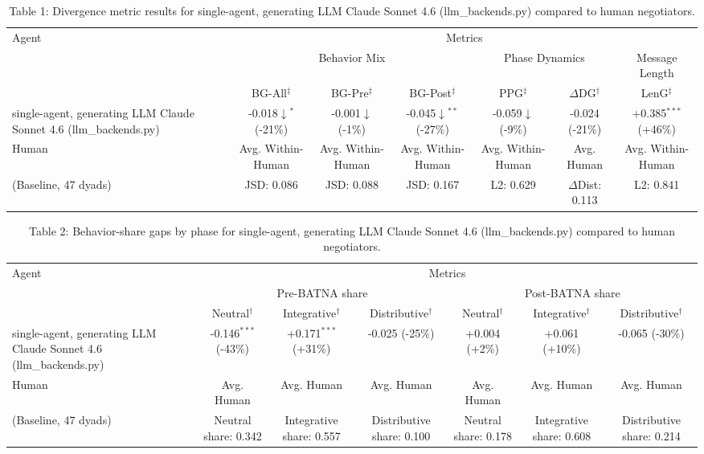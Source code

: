 \begin{table}[t]
\centering
\begin{tabular}{lcccccc}
\toprule
\multirow{3}{*}{Agent} & \multicolumn{6}{c}{Metrics} \\
\cmidrule(lr){2-7}
 & \multicolumn{3}{c}{Behavior Mix} & \multicolumn{2}{c}{Phase Dynamics} & \multicolumn{1}{c}{Message Length} \\
\cmidrule(lr){2-4} \cmidrule(lr){5-6} \cmidrule(lr){7-7}
 & BG-All$^\ddagger$ & BG-Pre$^\ddagger$ & BG-Post$^\ddagger$ & PPG$^\ddagger$ & $\Delta$DG$^\dagger$ & LenG$^\ddagger$ \\
\midrule
single-agent, generating LLM Claude Sonnet 4.6 (llm_backends.py) & -0.018$\downarrow$$^{*}$ (-21\%) & -0.001$\downarrow$ (-1\%) & -0.045$\downarrow$$^{**}$ (-27\%) & -0.059$\downarrow$ (-9\%) & -0.024 (-21\%) & +0.385$^{***}$ (+46\%) \\
\midrule
Human & Avg. Within-Human & Avg. Within-Human & Avg. Within-Human & Avg. Within-Human & Avg. Human & Avg. Within-Human \\
(Baseline, 47 dyads) & JSD: 0.086 & JSD: 0.088 & JSD: 0.167 & L2: 0.629 & $\Delta$Dist: 0.113 & L2: 0.841 \\
\bottomrule
\end{tabular}
\caption{Table 1: Divergence metric results for single-agent, generating LLM Claude Sonnet 4.6 (llm_backends.py) compared to human negotiators.}
\end{table}

\begin{table}[t]
\centering
\begin{tabular}{lcccccc}
\toprule
\multirow{3}{*}{Agent} & \multicolumn{6}{c}{Metrics} \\
\cmidrule(lr){2-7}
 & \multicolumn{3}{c}{Pre-BATNA share} & \multicolumn{3}{c}{Post-BATNA share} \\
\cmidrule(lr){2-4} \cmidrule(lr){5-7}
 & Neutral$^\dagger$ & Integrative$^\dagger$ & Distributive$^\dagger$ & Neutral$^\dagger$ & Integrative$^\dagger$ & Distributive$^\dagger$ \\
\midrule
single-agent, generating LLM Claude Sonnet 4.6 (llm_backends.py) & -0.146$^{***}$ (-43\%) & +0.171$^{***}$ (+31\%) & -0.025 (-25\%) & +0.004 (+2\%) & +0.061 (+10\%) & -0.065 (-30\%) \\
\midrule
Human & Avg. Human & Avg. Human & Avg. Human & Avg. Human & Avg. Human & Avg. Human \\
(Baseline, 47 dyads) & Neutral share: 0.342 & Integrative share: 0.557 & Distributive share: 0.100 & Neutral share: 0.178 & Integrative share: 0.608 & Distributive share: 0.214 \\
\bottomrule
\end{tabular}
\caption{Table 2: Behavior-share gaps by phase for single-agent, generating LLM Claude Sonnet 4.6 (llm_backends.py) compared to human negotiators.}
\end{table}
